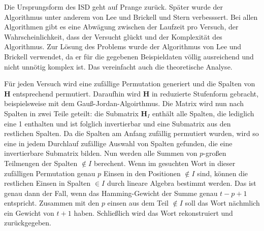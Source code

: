 \documentclass[a4paper,10pt,ngerman]{scrartcl}
\begin{document}
Die Ursprungsform des ISD geht auf Prange \cite{prangeUseInformationSets1962} zurück.
Später wurde der Algorithmus unter anderem von Lee und Brickell \cite{leeObservationSecurityMcEliece1988} und Stern \cite{sternMethodFindingCodewords1989} verbesssert. 
Bei allen Algorithmen gibt es eine Abwägung zwischen der Laufzeit pro Versuch, der Wahrscheinlichkeit, dass der Versucht glückt und der Komplexität des Algorithmus.
Zur Lösung des Problems wurde der Algorithmus von Lee und Brickell verwendet, da er für die gegebenen Beispieldaten völlig ausreichend und nicht unnötig komplex ist. Das vereinfacht auch die theoretische Analyse. 
Für jeden Versuch wird eine zufällige Permutation generiert und die Spalten von $\mathbf{H}$ entsprechend permutiert. Daraufhin wird $\mathbf{H}$ in reduzierte Stufenform gebracht, beispielsweise mit dem Gauß-Jordan-Algoirthmus.
Die Matrix wird nun nach Spalten in zwei Teile geteilt: die Submatrix $\mathbf{H}_I$ enthält alle Spalten, die lediglich eine 1 enthalten und ist folglich invertierbar und eine Submatrix aus den restlichen Spalten. 
Da die Spalten am Anfang zufällig permutiert wurden, wird so eine in jedem Durchlauf zufällige Auswahl von Spalten gefunden, die eine invertierbare Submatrix bilden. 
Nun werden alle Summen von $p$-großen Teilmengen der Spalten $\notin I$ berechent. 
Wenn im gesuchten Wort in dieser zufälligen Permutation genau $p$ Einsen in den Positionen $\notin I$ sind, können die restlichen Einsen in Spalten $\in I$ durch lineare Algebra bestimmt werden. 
Das ist genau dann der Fall, wenn das Hamming-Gewicht der Summe genau $t-p+1$ entspricht. Zusammen mit den $p$ einsen aus dem Teil $\notin I$ soll das Wort nächmlich ein Gewicht von $t+1$ haben. 
Schließlich wird das Wort rekonstruiert und zurückgegeben. 
\end{document}
